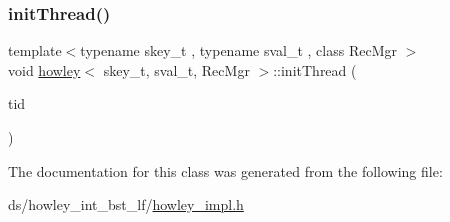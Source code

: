 \mbox{\label{classhowley_ad896657fb61ab833beb5854d3ab41195}} 
\subsubsection{\texorpdfstring{init\+Thread()}{initThread()}}
{\footnotesize\ttfamily template$<$typename skey\+\_\+t , typename sval\+\_\+t , class Rec\+Mgr $>$ \\
void \hyperlink{classhowley}{howley}$<$ skey\+\_\+t, sval\+\_\+t, Rec\+Mgr $>$\+::init\+Thread (\begin{DoxyParamCaption}\item[{const int}]{tid }\end{DoxyParamCaption})\hspace{0.3cm}{\ttfamily [inline]}}



The documentation for this class was generated from the following file\+:\begin{DoxyCompactItemize}
\item 
ds/howley\+\_\+int\+\_\+bst\+\_\+lf/\hyperlink{howley__impl_8h}{howley\+\_\+impl.\+h}\end{DoxyCompactItemize}
